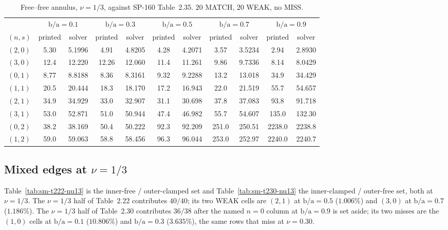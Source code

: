 \documentclass[11pt]{article}
\newcommand{\ba}{\mbox{b/a}}
\begin{document}
\begin{table}[htbp]\centering\footnotesize
\caption{Free--free annulus, $\nu=1/3$, against SP-160 Table~2.35.
$20$ MATCH, $20$ WEAK, no MISS.}
\label{tab:sm-t235-nu13}
\begin{tabular}{lcccccccccc}
\toprule
& \multicolumn{2}{c}{$\ba=0.1$} & \multicolumn{2}{c}{$\ba=0.3$}
& \multicolumn{2}{c}{$\ba=0.5$} & \multicolumn{2}{c}{$\ba=0.7$}
& \multicolumn{2}{c}{$\ba=0.9$}\\
\cmidrule(lr){2-3}\cmidrule(lr){4-5}\cmidrule(lr){6-7}\cmidrule(lr){8-9}\cmidrule(lr){10-11}
$(n,s)$ & printed & solver & printed & solver & printed & solver
& printed & solver & printed & solver\\
\midrule
$(2,0)$ & 5.30 & 5.1996 & 4.91 & 4.8205 & 4.28 & 4.2071 & 3.57 & 3.5234 & 2.94 & 2.8930 \\
$(3,0)$ & 12.4 & 12.220 & 12.26 & 12.060 & 11.4 & 11.261 & 9.86 & 9.7336 & 8.14 & 8.0429 \\
$(0,1)$ & 8.77 & 8.8188 & 8.36 & 8.3161 & 9.32 & 9.2288 & 13.2 & 13.018 & 34.9 & 34.429 \\
$(1,1)$ & 20.5 & 20.444 & 18.3 & 18.170 & 17.2 & 16.943 & 22.0 & 21.519 & 55.7 & 54.657 \\
$(2,1)$ & 34.9 & 34.929 & 33.0 & 32.907 & 31.1 & 30.698 & 37.8 & 37.083 & 93.8 & 91.718 \\
$(3,1)$ & 53.0 & 52.871 & 51.0 & 50.944 & 47.4 & 46.982 & 55.7 & 54.607 & 135.0 & 132.30 \\
$(0,2)$ & 38.2 & 38.169 & 50.4 & 50.222 & 92.3 & 92.209 & 251.0 & 250.51 & 2238.0 & 2238.8 \\
$(1,2)$ & 59.0 & 59.063 & 58.8 & 58.456 & 96.3 & 96.044 & 253.0 & 252.97 & 2240.0 & 2240.7 \\
\bottomrule
\end{tabular}
\end{table}

\subsection{Mixed edges at \texorpdfstring{$\nu=1/3$}{nu=1/3}}\label{sec:sm-mixed}
Table~\ref{tab:sm-t222-nu13} is the inner-free / outer-clamped set and
Table~\ref{tab:sm-t230-nu13} the inner-clamped / outer-free set, both at
$\nu=1/3$. The $\nu=1/3$ half of Table~2.22 contributes $40/40$; its two WEAK
cells are $(2,1)$ at $\ba=0.5$ ($1.006\%$) and $(3,0)$ at $\ba=0.7$
($1.186\%$). The $\nu=1/3$ half of Table~2.30 contributes $36/38$ after the
named $n=0$ column at $\ba=0.9$ is set aside; its two misses are the $(1,0)$
cells at $\ba=0.1$ ($10.806\%$) and $\ba=0.3$ ($3.635\%$), the same rows that
miss at $\nu=0.30$.
\end{document}
